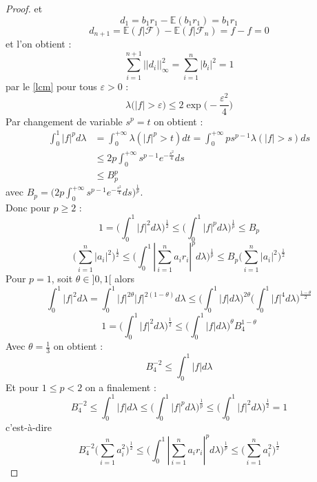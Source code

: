 \documentclass[12pt]{article}
\theoremstyle{definition}
\begin{document}
\begin{proof}
	et 
	\begin{equation*}
		d_1 = b_1r_1 - \mathbb{E}(b_1r_1)=b_1r_1
	\end{equation*}
	\begin{equation*}
		d_{n+1} = \mathbb{E}(f|\mathcal{F})-\mathbb{E}(f|\mathcal{F}_n)= f-f=0
	\end{equation*}
	et l'on obtient :
	\begin{equation*}
	\sum_{i=1}^{n+1}||d_i||^2_\infty = \sum_{i=1}^{n}|b_i|^2=1
	\end{equation*}
	par le \cref{lcm} pour tous $\varepsilon>0$ :
	\begin{equation*}
		\lambda\big(|f|>\varepsilon\big)\leq 2 \exp\big(-\frac{\varepsilon^2}{4}\big)
	\end{equation*}
	Par changement de variable $s^p=t$ on obtient :
	\begin{align*}
		\int_{0}^{1}|f|^p d\lambda &= \int_{0}^{+\infty}\lambda(|f|^p>t)dt = \int_{0}^{+\infty}p s^{p-1}\lambda(|f|>s)ds \\
		&\leq 2p\int_{0}^{+\infty}s^{p-1}e^{-\frac{s^2}{4}}ds\\
		&\leq B_p^p
	\end{align*}
	avec $B_p= \big(2p\int_{0}^{+\infty}s^{p-1}e^{-\frac{s^2}{4}}ds\big)^{\frac{1}{p}}$.\\
	Donc pour $p\geq 2$ : 
	\begin{equation*}
		1 =\big(\int_{0}^{1}|f|^2d\lambda\big)^{\frac{1}{2}}\leq \big(\int_{0}^{1}|f|^pd\lambda\big)^{\frac{1}{p}}\leq B_p
	\end{equation*}
	\begin{equation*}
		\big(\sum_{i=1}^{n}|a_i|^2\big)^{\frac{1}{2}} \leq \big(\int_{0}^{1}|\sum_{i=1}^{n}a_ir_i|^pd\lambda\big)^{\frac{1}{p}}\leq B_p\big(\sum_{i=1}^{n}|a_i|^2\big)^{\frac{1}{2}} 
	\end{equation*}
	Pour $p=1$, soit $\theta\in]0,1[$ alors 
	\begin{equation*}
		\int_{0}^{1}|f|^{2}d\lambda=\int_{0}^{1}|f|^{2\theta}|f|^{2(1-\theta)}d\lambda\leq\Bigg(\int_{0}^1 |f| d\lambda\Bigg)^{2\theta}\Bigg(\int_{0}^1|f|^{4}d\lambda\Bigg)^{\frac{1-\theta}{2}}
	\end{equation*}
	\begin{equation*}
		1 = \Bigg(\int_{0}^{1}|f|^{2}d\lambda\Bigg)^{\frac{1}{2}}\leq \Bigg(\int_{0}^1 |f| d\lambda\Bigg)^{\theta}B_4^{1-\theta}
	\end{equation*}
	Avec $\theta=\frac{1}{3}$ on obtient :
	\begin{equation*}
		B_4^{-2} \leq \int_{0}^1 |f| d\lambda
	\end{equation*}
	Et pour $1\leq p <2 $ on a finalement :
	\begin{equation*}
		B_4^{-2}\leq \int_{0}^1 |f| d\lambda \leq \Big(\int_0^1|f|^pd\lambda \Big)^{\frac{1}{p}}\leq \Big(\int_{0}^{1}|f|^{2}d\lambda\Big)^{\frac{1}{2}}=1
	\end{equation*}
	c'est-à-dire 
	\begin{equation*}
		B_4^{-2}\big(\sum_{i=1}^{n}a_i^2\big)^{\frac{1}{2}}\leq \Big(\int_0^1|\sum_{i=1}^{n}a_ir_i|^pd\lambda \Big)^{\frac{1}{p}}\leq \big(\sum_{i=1}^{n}a_i^2\big)^{\frac{1}{2}}
	\end{equation*}
	\end{proof}
\newpage
\nocite{GP}
\nocite{VM2}
\nocite{VMGS}
\printbibliography
\end{document}
